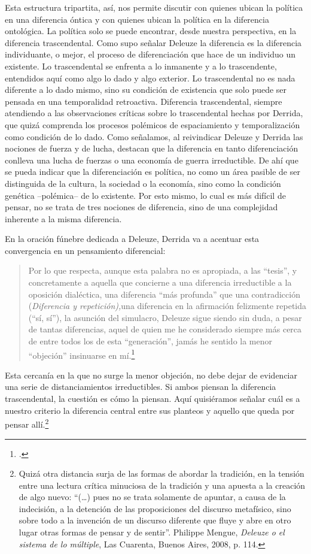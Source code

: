 \documentclass{book}
\begin{document}
Esta estructura tripartita, así, nos permite discutir con quienes ubican
la política en una diferencia óntica y con quienes ubican la política en
la diferencia ontológica. La política solo se puede encontrar, desde
nuestra perspectiva, en la diferencia trascendental. Como supo señalar
Deleuze la diferencia es la diferencia individuante, o mejor, el proceso
de diferenciación que hace de un individuo un existente. Lo
trascendental se enfrenta a lo inmanente y a lo trascendente, entendidos
aquí como algo lo dado y algo exterior. Lo trascendental no es nada
diferente a lo dado mismo, sino su condición de existencia que solo
puede ser pensada en una temporalidad retroactiva. Diferencia
trascendental, siempre atendiendo a las observaciones críticas sobre lo
trascendental hechas por Derrida, que quizá comprenda los procesos
polémicos de espaciamiento y temporalización como condición de lo dado.
Como señalamos, al reivindicar Deleuze y Derrida las nociones de fuerza
y de lucha, destacan que la diferencia en tanto diferenciación conlleva
una lucha de fuerzas o una economía de guerra irreductible. De ahí que
se pueda indicar que la diferenciación es política, no como un área
pasible de ser distinguida de la cultura, la sociedad o la economía,
sino como la condición genética --polémica-- de lo existente. Por esto
mismo, lo cual es más difícil de pensar, no se trata de tres nociones de
diferencia, sino de una complejidad inherente a la misma diferencia.

En la oración fúnebre dedicada a Deleuze, Derrida va a acentuar esta
convergencia en un pensamiento diferencial:

\begin{quote}
Por lo que respecta, aunque esta palabra no es apropiada, a las
``tesis'', y concretamente a aquella que concierne a una diferencia
irreductible a la oposición dialéctica, una diferencia ``más profunda''
que una contradicción (\emph{Diferencia y repetición),}una diferencia en
la afirmación felizmente repetida (``sí, sí''), la asunción del
simulacro, Deleuze sigue siendo sin duda, a pesar de tantas diferencias,
aquel de quien me he considerado siempre más cerca de entre todos los de
esta ``generación'', jamás he sentido la menor ``objeción'' insinuarse
en mí.\footcite{derrida2005}
\end{quote}

Esta cercanía en la que no surge la menor objeción, no debe dejar de
evidenciar una serie de distanciamientos irreductibles. Si ambos piensan
la diferencia trascendental, la cuestión es cómo la piensan. Aquí
quisiéramos señalar cuál es a nuestro criterio la diferencia central
entre sus planteos y aquello que queda por pensar allí.\footnote{Quizá
  otra distancia surja de las formas de abordar la tradición, en la
  tensión entre una lectura crítica minuciosa de la tradición y una
  apuesta a la creación de algo nuevo: \enquote{(\dots) pues no se trata
  solamente de apuntar, a causa de la indecisión, a la detención de las
  proposiciones del discurso metafísico, sino sobre todo a la invención
  de un discurso diferente que fluye y abre en otro lugar otras formas
  de pensar y de sentir}. Philippe Mengue, \emph{Deleuze o el sistema de
  lo múltiple}, Las Cuarenta, Buenos Aires, 2008, p. 114.}
\end{document}

